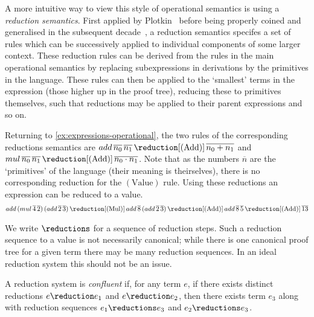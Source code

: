 A more intuitive way to view this style of operational semantics is using
a \emph{reduction semantics}.
First applied by Plotkin~\cite{plotkin1975callbyname} before being properly
coined and generalised in the subsequent
decade~\cite{felleisen1987reduction,felleisen1987calculi}, a reduction semantics
specifes a set of rules which can be successively applied to individual
components of some larger context. These reduction rules can be derived from
the rules in the main operational semantics by replacing subexpressions in
derivations by the primitives in the language.
These rules can then be applied to the `smallest' terms in the expression
(those higher up in the proof tree), reducing these to primitives themselves,
such that reductions may be applied to their parent expressions and so on.

\begin{example}\label{ex:expressions-reduction}
    Returning to \cref{ex:expressions-operational}, the two rules of the
    corresponding reductions semantics are \(
    add \, \overline{n_0} \, \overline{n_1}
    \,\reduction[(\text{Add})]\,
    \overline{n_0 + n_1}
    \) and \(
    mul \, \overline{n_0} \, \overline{n_1}
    \,\reduction[(\text{Add})]\,
    \overline{n_0 \cdot n_1}
    \).
    Note that as the numbers \(\overline{n}\) are the `primitives' of the
    language (their meaning is theirselves), there is no corresponding reduction
    for the \((\text{Value})\) rule.
    Using these reductions an expression can be reduced to a value.
    \begin{gather*}
        add \, (mul \, \overline{4} \, \overline{2}) \, (add \, \overline{2} \, \overline{3})
        \,\reduction[(\text{Mul})]\,
        add \, \overline{8} \, (add \, \overline{2} \, \overline{3})
        \,\reduction[(\text{Add})]\,
        add \, \overline{8} \, \overline{5}
        \,\reduction[(\text{Add})]\,
        \overline{13}
    \end{gather*}
\end{example}

We write \(\reductions\) for a sequence of reduction steps.
Such a reduction sequence to a value is not necessarily canonical; while there
is one canonical proof tree for a given term there may be many reduction
sequences.
In an ideal reduction system this should not be an issue.

\begin{definition}
    A reduction system is \emph{confluent} if, for any term \(e\), if there
    exists distinct reductions \(e \reduction e_1\) and \(e \reduction e_2\),
    then there exists term \(e_3\) along with reduction sequences
    \(e_1 \reductions e_3\) and \(e_2 \reductions e_3\).
\end{definition}

